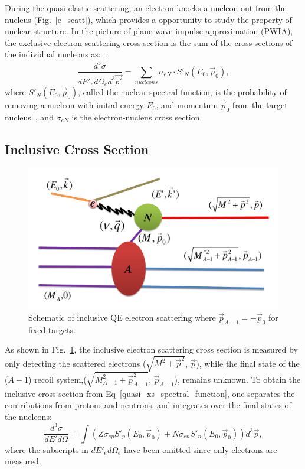 During the quasi-elastic scattering, an electron knocks a nucleon out from the nucleus (Fig.~\ref{e_scatt}), which provides a opportunity to study the property of nuclear structure. In the picture of plane-wave impulse approximation (PWIA), the exclusive electron scattering cross section is the sum of the cross sections of the individual nucleons as:~\cite{john_thesis}:
\begin{equation}
  \frac{d^{5}\sigma}{dE'_{e}d\Omega_{e} d^{3}\vec{p'}} = \sum_{nucleons}\sigma_{eN}\cdot S'_{N}(E_{0},\vec{p}_{0}),
  \label{quasi_xs_spectral_function}
\end{equation}
where $S'_{N}(E_{0},\vec{p}_{0})$, called the nuclear spectral function, is the probability of removing a nucleon with initial energy $E_{0}$,  and momentum $\vec{p}_{0}$ from the target nucleus~\cite{qe_donal}, and $\sigma_{eN}$ is the electron-nucleus cross section. 

\subsection{Inclusive Cross Section}
\begin{figure}[!ht]
  \begin{center}
    \includegraphics[type=pdf,ext=.pdf,read=.pdf,width=0.60\linewidth]{./figures/physics/includ_diagram}
    \caption[Schematic of inclusive QE electron scattering]{\footnotesize{Schematic of inclusive QE electron scattering where $\vec{p}_{A-1} = -\vec{p}_{0}$ for fixed targets.}}
    \label{includ_scatt_diag}
  \end{center}
\end{figure}
As shown in Fig.~\ref{includ_scatt_diag}, the inclusive electron scattering cross section is measured by only detecting the scattered electrons ($\sqrt{M^{2}+ \vec{p}^{2}}$, $\vec{p}$), while the final state of the ($A-1$) recoil system,($\sqrt{M_{A-1}^{2}+ \vec{p}_{A-1}^{2}}$, $\vec{p}_{A-1}$), remains unknown. To obtain the inclusive cross section from Eq~\eqref{quasi_xs_spectral_function}, one separates the contributions from protons and neutrons, and integrates over the final states of the nucleons:
\begin{equation}
  \frac{d^{3}\sigma}{dE'd\Omega} = \int (Z\sigma_{ep}S'_{p}(E_{0},\vec{p}_{0})+N\sigma_{en}S'_{n}(E_{0},\vec{p}_{0})) d^{3}\vec{p},
\end{equation}
where the subscripts in $dE'_{e}d\Omega_{e}$ have been omitted since only electrons are measured.

